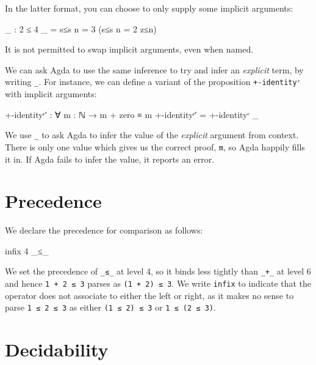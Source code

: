 In the latter format, you can choose to only supply some implicit
arguments:

\begin{fence}
\begin{code}
_ : 2 ≤ 4
_ = s≤s {n = 3} (s≤s {n = 2} z≤n)
\end{code}
\end{fence}

It is not permitted to swap implicit arguments, even when named.

We can ask Agda to use the same inference to try and infer an
\emph{explicit} term, by writing \texttt{\_}. For instance, we can
define a variant of the proposition \texttt{+-identityʳ} with implicit
arguments:

\begin{fence}
\begin{code}
+-identityʳ′ : ∀ {m : ℕ} → m + zero ≡ m
+-identityʳ′ = +-identityʳ _
\end{code}
\end{fence}

We use \texttt{\_} to ask Agda to infer the value of the \emph{explicit}
argument from context. There is only one value which gives us the
correct proof, \texttt{m}, so Agda happily fills it in. If Agda fails to
infer the value, it reports an error.

\hypertarget{precedence}{%
\section{Precedence}\label{precedence}}

We declare the precedence for comparison as follows:

\begin{fence}
\begin{code}
infix 4 _≤_
\end{code}
\end{fence}

We set the precedence of \texttt{\_≤\_} at level 4, so it binds less
tightly than \texttt{\_+\_} at level 6 and hence \texttt{1\ +\ 2\ ≤\ 3}
parses as \texttt{(1\ +\ 2)\ ≤\ 3}. We write \texttt{infix} to indicate
that the operator does not associate to either the left or right, as it
makes no sense to parse \texttt{1\ ≤\ 2\ ≤\ 3} as either
\texttt{(1\ ≤\ 2)\ ≤\ 3} or \texttt{1\ ≤\ (2\ ≤\ 3)}.

\hypertarget{decidability}{%
\section{Decidability}\label{decidability}}

